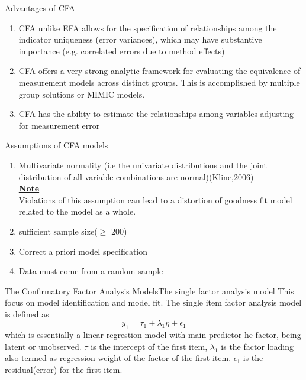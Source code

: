 \documentclass{beamer}
\begin{document}
\begin{frame}{Advantages of CFA}
	\begin{enumerate}
		\item CFA unlike EFA allows for the specification of relationships among the indicator uniqueness (error variances), which may have substantive importance (e.g. correlated errors due to method effects)
		\item CFA offers a very strong analytic framework for evaluating the equivalence of measurement models across distinct groups. This is accomplished by multiple group solutions or MIMIC models.
		\item CFA has the ability to estimate the relationships among variables adjusting for measurement error
	\end{enumerate}
\end{frame}
\begin{frame}{Assumptions of CFA models}
	\begin{enumerate}
		\item Multivariate normality (i.e the univariate distributions and the joint distribution of all variable combinations are normal)(Kline,2006)\\
		\textbf{\underline{Note}}\\
		Violations of this assumption can lead to a distortion of goodness fit model related to the model as a whole.
		\item sufficient sample size($\geq$ 200)
		\item Correct a priori model specification
		\item Data must come from a random sample
	\end{enumerate}
\end{frame}
\begin{frame}{The Confirmatory Factor Analysis Models}{The single factor analysis model}
	This focus on model identification and model fit. The single item factor analysis model is defined as
	\begin{equation}
		y_1=\tau_1 +\lambda_1 \eta + \epsilon_1
	\end{equation}
which is essentially a linear regrestion model with main predictor he factor, being latent or unobserved. $\tau$ is the intercept of the first item, $\lambda_1$ is the factor loading also termed as regression weight of the factor of the first item. $\epsilon_1$ is the residual(error) for the first item.\\
\end{frame}
\end{document}
